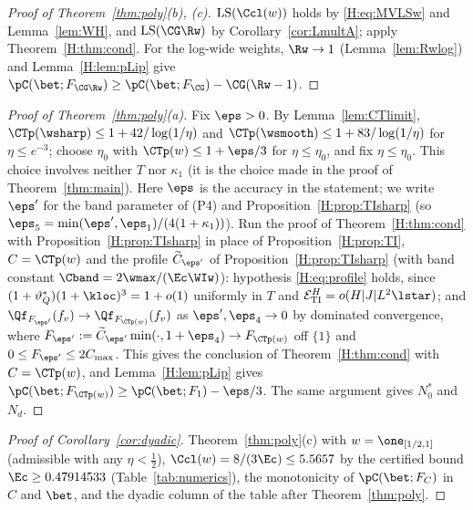 \begin{proof}[Proof of Theorem~\ref{thm:poly}(b), (c)]
$\mathrm{LS}(\Ccl(w))$ holds by \eqref{H:eq:MVLSw} and Lemma~\ref{lem:WH}, and $\mathrm{LS}(\CG\Rw)$ by Corollary~\ref{cor:LmultA}; apply Theorem~\ref{H:thm:cond}. For the log-wide weights, $\Rw\to1$ (Lemma~\ref{lem:Rwlog}) and Lemma~\ref{H:lem:pLip} give $\pC(\bet;F_{\CG\Rw})\ge\pC(\bet;F_{\CG})-\CG(\Rw-1)$.
\end{proof}

\begin{proof}[Proof of Theorem~\ref{thm:poly}(a)]
Fix $\eps>0$. By Lemma~\ref{lem:CTlimit}, $\CTp(\wsharp)\le1+42/\log(1/\eta)$ and $\CTp(\wsmooth)\le1+83/\log(1/\eta)$ for $\eta\le e^{-3}$; choose $\eta_0$ with $\CTp(w)\le1+\eps/3$ for $\eta\le\eta_0$, and fix $\eta\le\eta_0$. This choice involves neither $T$ nor $\kappa_1$ (it is the choice made in the proof of Theorem~\ref{thm:main}). Here $\eps$ is the accuracy in the statement; we write $\eps'$ for the band parameter of (P4) and Proposition~\ref{H:prop:TIsharp} (so $\eps_5=\min(\eps',\eps_1)/(4(1+\kappa_1))$). Run the proof of Theorem~\ref{H:thm:cond} with Proposition~\ref{H:prop:TIsharp} in place of Proposition~\ref{H:prop:TI}, $C=\CTp(w)$ and the profile $\widetilde C_{\eps'}$ of Proposition~\ref{H:prop:TIsharp} (with band constant $\Cband=2\wmax/(\Ec\WIw)$): hypothesis \eqref{H:eq:profile} holds, since $(1+\vartheta^*_Q)(1+\kloc)^3=1+o(1)$ uniformly in $T$ and $\mathcal E^H_{\rm TI}=o(H|J|L^2\lstar)$; and $\Qf_{F_{\eps'}}(f_v)\to\Qf_{F_{\CTp(w)}}(f_v)$ as $\eps',\eps_4\to0$ by dominated convergence, where $F_{\eps'}:=\widetilde C_{\eps'}\min(\cdot,1+\eps_4)\to F_{\CTp(w)}$ off $\{1\}$ and $0\le F_{\eps'}\le2C_{\max}$. This gives the conclusion of Theorem~\ref{H:thm:cond} with $C=\CTp(w)$, and Lemma~\ref{H:lem:pLip} gives $\pC(\bet;F_{\CTp(w)})\ge\pC(\bet;F_1)-\eps/3$. The same argument gives $N^*_0$ and $N_d$.
\end{proof}

\begin{proof}[Proof of Corollary~\ref{cor:dyadic}]
Theorem~\ref{thm:poly}(c) with $w=\one_{[1/2,1]}$ (admissible with any $\eta<\frac12$), $\Ccl(w)=8/(3\Ec)\le5.5657$ by the certified bound $\Ec\ge0.47914533$ (Table~\ref{tab:numerics}), the monotonicity of $\pC(\bet;F_C)$ in $C$ and $\bet$, and the dyadic column of the table after Theorem~\ref{thm:poly}.
\end{proof}

